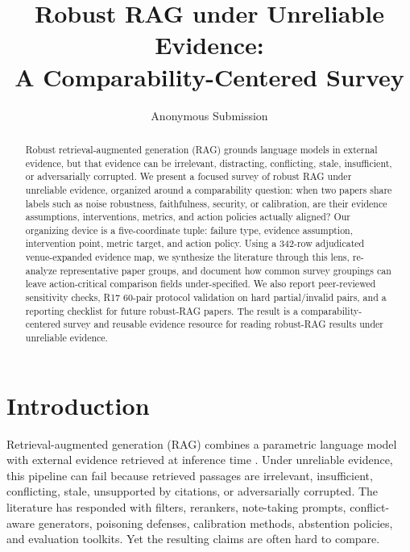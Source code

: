 \documentclass[runningheads]{llncs}
\begin{document}
\title{Robust RAG under Unreliable Evidence:\\A Comparability-Centered Survey}
\author{Anonymous Submission}

\maketitle

\begin{abstract}
Robust retrieval-augmented generation (RAG) grounds language models in external evidence, but that evidence can be irrelevant, distracting, conflicting, stale, insufficient, or adversarially corrupted. We present a focused survey of robust RAG under unreliable evidence, organized around a comparability question: when two papers share labels such as noise robustness, faithfulness, security, or calibration, are their evidence assumptions, interventions, metrics, and action policies actually aligned? Our organizing device is a five-coordinate tuple: failure type, evidence assumption, intervention point, metric target, and action policy. Using a 342-row adjudicated venue-expanded evidence map, we synthesize the literature through this lens, re-analyze representative paper groups, and document how common survey groupings can leave action-critical comparison fields under-specified. We also report peer-reviewed sensitivity checks, R17 60-pair protocol validation on hard partial/invalid pairs, and a reporting checklist for future robust-RAG papers. The result is a comparability-centered survey and reusable evidence resource for reading robust-RAG results under unreliable evidence.

\end{abstract}

\section{Introduction}

Retrieval-augmented generation (RAG) combines a parametric language model with external evidence retrieved at inference time \cite{lewis2020rag}. Under unreliable evidence, this pipeline can fail because retrieved passages are irrelevant, insufficient, conflicting, stale, unsupported by citations, or adversarially corrupted. The literature has responded with filters, rerankers, note-taking prompts, conflict-aware generators, poisoning defenses, calibration methods, abstention policies, and evaluation toolkits. Yet the resulting claims are often hard to compare.
\end{document}
